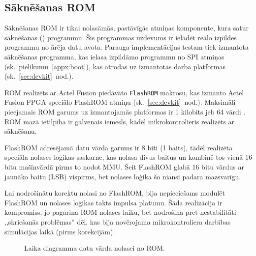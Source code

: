\subsection{Sāknēšanas ROM} \label{sec:rom}
	Sāknēšanas ROM ir tikai nolasāmās, pastāvīgās atmiņas komponente, kura
	satur sāknēšanas () programmu.
	Šīs programmas uzdevums ir ielādēt reālo izpildes programmu no
	ārēja datu avota. Parauga implementācijas testam tiek izmantota
	sāknēšanas programma, kas ielasa izpildāmo programmu no SPI 
	atmiņas (sk.~pielikumu~\ref{appx:boot}), kas atrodas uz izmantotās
	darba platformas (sk.~\ref{sec:devkit}~nod.).
	
	ROM realizēts ar Actel Fusion piedāvāto
	\texttt{FlashROM} makrosu, kas izmanto Actel Fusion FPGA
	speciālo FlashROM atmiņu \cite{FlashROM} (sk.~\ref{sec:devkit}~nod.).
	Maksimāli pieejamais ROM garums uz izmantojamās platformas ir
	1 kilobits jeb 64 vārdi \cite[12.~lpp.]{FusionGuide}. ROM mazā ietilpība ir
	galvenais iemesls, kādēļ mikrokontrolieris realizēts ar sāknēšanu.
	
	FlashROM adresējamā datu vārda garums ir 8 biti (1 baits),
	tādēļ realizēta speciāla nolases loģikas saskarne, kas nolasa divus
	baitus un kombinē tos vienā 16 bitu mašīnvārdā pirms to nodot MMU.
	Šeit FlashROM glabā 16 bitu vārdus ar jaunāko baitu (LSB) 
	vispirms, bet nolases loģika šo niansi padara mazsvarīgu.
	
	Lai nodrošinātu korektu nolasi no FlashROM, bija nepieciešams
	modulēt FlashROM un nolases loģikas takts impulsa platumu.
	Šāda realizācija ir kompromiss, jo pagarina ROM nolases laiku, bet
	nodrošina pret nestabilitāti ,,skriešanās problēmas'' dēļ, kas bija
	novērojama mikrokontroliera darbības simulācijas laikā (pirms korekcijām).
	
	\begin{figure}[tbh]
		\centering
		\def\svgwidth{\textwidth}
		{\ttfamily\small}
		\caption{Laika diagramma datu vārda nolasei no ROM.}
		\label{fig:rom-time-diag}
	\end{figure}
	
